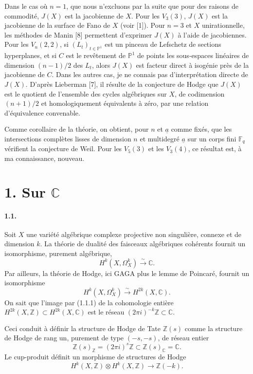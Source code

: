 \documentclass[10pt]{article}
\newcommand{\C}{\mathbb C}
\newcommand{\F}{\mathbb F}
\newcommand{\Pj}{\mathbb P}
\newcommand{\Z}{\mathbb Z}
\newcommand{\iso}{\xrightarrow{\sim}}
\begin{document}
Dans le cas où \(n=1\), que nous n'excluons par la suite que pour des raisons de commodité, \(J(X)\) est la jacobienne de \(X\). Pour les \(V_3(3)\), \(J(X)\) est la jacobienne de la surface de Fano de \(X\) (voir [1]). Pour \(n=3\) et \(X\) unirationnelle, les méthodes de Manin [8] permettent d'exprimer \(J(X)\) à l'aide de jacobiennes. Pour les \(V_n(2,2)\), si \((L_t)_{t\in\Pj^1}\) est un pinceau de Lefschetz de sections hyperplanes, et si \(C\) est le revêtement de \(\Pj^1\) de points les sous-espaces linéaires de dimension \((n-1)/2\) des \(L_t\), alors \(J(X)\) est facteur direct à isogénie près de la jacobienne de \(C\). Dans les autres cas, je ne connais pas d'interprétation directe de \(J(X)\). D'après Lieberman [7], il résulte de la conjecture de Hodge que \(J(X)\) est le quotient de l'ensemble des cycles algébriques sur \(X\), de codimension \((n+1)/2\) et homologiquement équivalents à zéro, par une relation d'équivalence convenable.

Comme corollaire de la théorie, on obtient, pour \(n\) et \(\underline a\) comme fixés, que les intersections complètes lisses de dimension \(n\) et multidegré \(\underline a\) sur un corps fini \(\F_q\) vérifient la conjecture de Weil. Pour les \(V_5(3)\) et les \(V_3(4)\), ce résultat est, à ma connaissance, nouveau.

\section*{1. Sur \(\C\)}

\paragraph{1.1.} Soit \(X\) une variété algébrique complexe projective non singulière, connexe et de dimension \(k\). La théorie de dualité des faisceaux algébriques cohérents fournit un isomorphisme, purement algébrique,
\[
\tag{1.1.1}
H^k(X,\Omega_X^k)\iso\C.
\]
Par ailleurs, la théorie de Hodge, ici GAGA plus le lemme de Poincaré, fournit un isomorphisme
\[
\tag{1.1.2}
H^k(X,\Omega_X^k)\iso H^{2k}(X,\C).
\]
On sait que l'image par (1.1.1) de la cohomologie entière \(H^{2k}(X,\Z)\subset H^{2k}(X,\C)\) est le réseau \((2\pi i)^{-k}\Z\subset\C\).

Ceci conduit à définir la structure de Hodge de Tate \(\Z(s)\) comme la structure de Hodge de rang un, purement de type \((-s,-s)\), de réseau entier
\[
\Z(s)_\Z=(2\pi i)^s\Z\subset \Z(s)_\C=\C.
\]
Le cup-produit définit un morphisme de structures de Hodge
\[
\tag{1.1.3}
H^k(X,\Z)\otimes H^k(X,\Z)\longrightarrow\Z(-k).
\]
\end{document}

